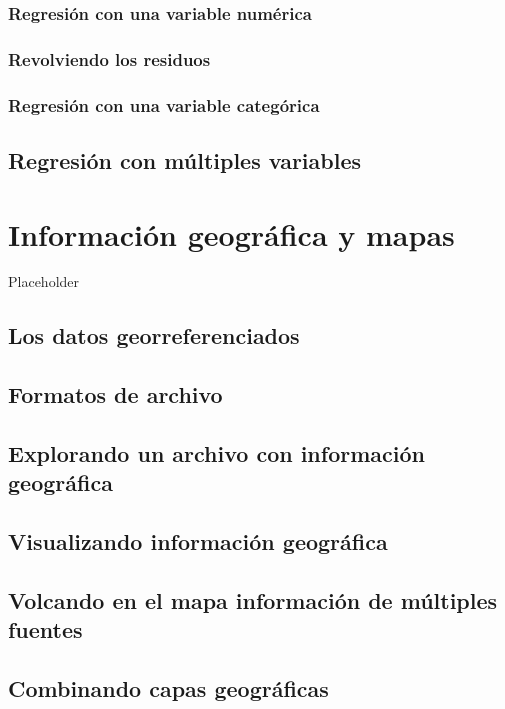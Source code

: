 \documentclass[]{book}
\begin{document}
\subsection{Regresión con una variable
numérica}\label{regresion-con-una-variable-numerica}

\subsection{Revolviendo los residuos}\label{revolviendo-los-residuos}

\subsection{Regresión con una variable
categórica}\label{regresion-con-una-variable-categorica}

\section{Regresión con múltiples
variables}\label{regresion-con-multiples-variables}

\chapter{Información geográfica y
mapas}\label{informacion-geografica-y-mapas}

Placeholder

\section{Los datos georreferenciados}\label{los-datos-georreferenciados}

\section{Formatos de archivo}\label{formatos-de-archivo}

\section{Explorando un archivo con información
geográfica}\label{explorando-un-archivo-con-informacion-geografica}

\section{Visualizando información
geográfica}\label{visualizando-informacion-geografica}

\section{Volcando en el mapa información de múltiples
fuentes}\label{volcando-en-el-mapa-informacion-de-multiples-fuentes}

\section{Combinando capas
geográficas}\label{combinando-capas-geograficas}


\end{document}
